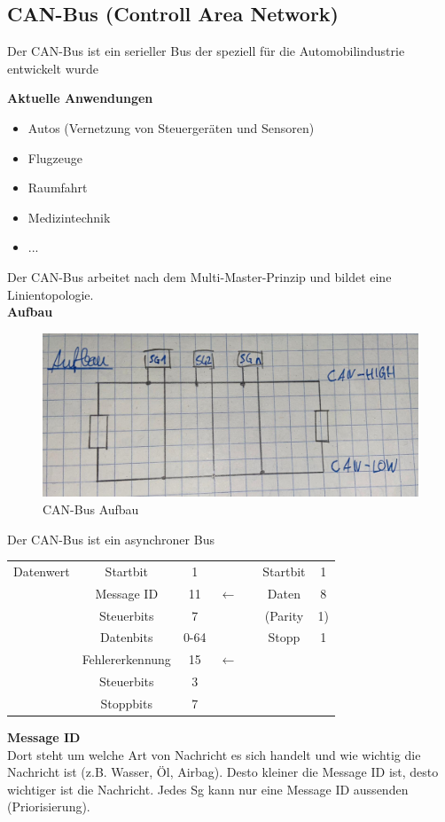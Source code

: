 \subsection{CAN-Bus (Controll Area Network)}
Der CAN-Bus ist ein serieller Bus der speziell für die Automobilindustrie entwickelt wurde

\textbf{Aktuelle Anwendungen} \\
\begin{itemize}
	\item Autos (Vernetzung von Steuergeräten und Sensoren)
	\item Flugzeuge
	\item Raumfahrt
	\item Medizintechnik
	\item ...
\end{itemize}
Der CAN-Bus arbeitet nach dem Multi-Master-Prinzip und bildet eine Linientopologie. \\
\textbf{Aufbau}
\begin{figure}[H]
	\centering
	\includegraphics[width=0.8\linewidth]{figures/canbus.jpeg}
	\caption{CAN-Bus Aufbau}
\end{figure}
Der CAN-Bus ist ein asynchroner Bus \\
\begin{tabular}{ccccccc}
	Datenwert & Startbit & 1 & \checkmark && Startbit & 1 \\
	& Message ID & 11 & $\leftarrow$ && Daten & 8 \\
	& Steuerbits & 7 & \checkmark && (Parity & 1) \\
	& Datenbits & 0-64 & \checkmark && Stopp & 1 \\
	& Fehlererkennung & 15 & $\leftarrow$ &&  &  \\
	& Steuerbits & 3 & \checkmark &&  &  \\
	& Stoppbits & 7 & \checkmark &&  &  \\
\end{tabular}

\textbf{Message ID} \\
Dort steht um welche Art von Nachricht es sich handelt und wie wichtig die Nachricht ist (z.B. Wasser, Öl, Airbag). Desto kleiner die Message ID ist, desto wichtiger ist die Nachricht. Jedes Sg kann nur eine Message ID aussenden (Priorisierung).

